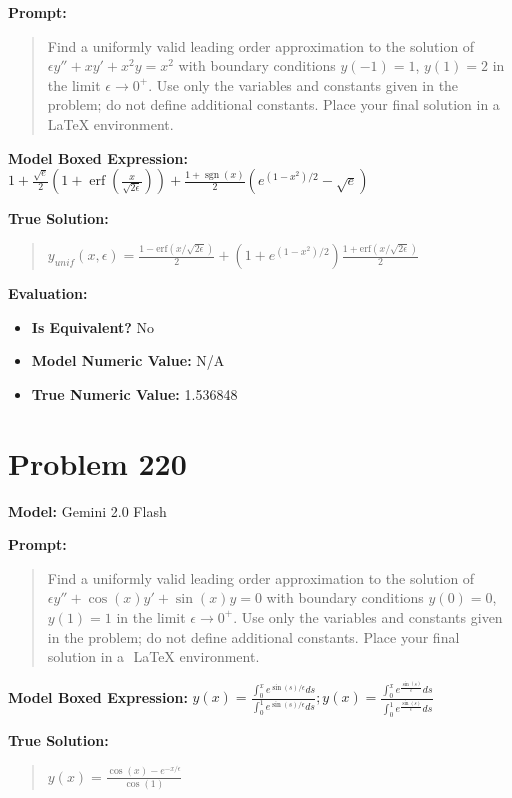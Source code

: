 \documentclass{article}
\begin{document}
{\textbf{Prompt:}
\begin{quote}
Find a uniformly valid leading order approximation to the solution of $\epsilon y'' + x y' + x^2 y = x^2$ with boundary conditions $y(-1) = 1$, $y(1) = 2$ in the limit $\epsilon \to 0^+$. Use only the variables and constants given in the problem; do not define additional constants. Place your final solution in a $\boxed{}$ LaTeX environment.
\end{quote}
\textbf{Model Boxed Expression:} $1 + \frac{\sqrt{e}}{2}\left(1 + \operatorname{erf}\left(\frac{x}{\sqrt{2\epsilon}}\right)\right) + \frac{1+\operatorname{sgn}(x)}{2}\left(e^{(1-x^2)/2} - \sqrt{e}\right)$

\textbf{True Solution:}
\begin{quote}
$y_{unif}(x, \epsilon) = \frac{1-\text{erf}(x/\sqrt{2\epsilon})}{2} + \left(1 + e^{(1-x^2)/2}\right) \frac{1+\text{erf}(x/\sqrt{2\epsilon})}{2}$
\end{quote}

\textbf{Evaluation:}
\begin{itemize}
\item \textbf{Is Equivalent?} No
\item \textbf{Model Numeric Value:} N/A
\item \textbf{True Numeric Value:} 1.536848
\end{itemize}
\vspace{1cm}
\section*{Problem 220}
\textbf{Model:} Gemini 2.0 Flash

\textbf{Prompt:}
\begin{quote}
Find a uniformly valid leading order approximation to the solution of $\epsilon y'' + \cos(x) y ' + \sin(x) y= 0$ with boundary conditions $y(0) = 0$, $y(1)= 1$ in the limit $\epsilon \to 0^+$. Use only the variables and constants given in the problem; do not define additional constants. Place your final solution in a $\boxed{}$ LaTeX environment.
\end{quote}
\textbf{Model Boxed Expression:} $y(x) = \frac{\int_0^x e^{\sin(s)/\epsilon} ds}{\int_0^1 e^{\sin(s)/\epsilon} ds}; y(x) = \frac{\int_0^x e^{\frac{\sin(s)}{\epsilon}} ds}{\int_0^1 e^{\frac{\sin(s)}{\epsilon}} ds}$

\textbf{True Solution:}
\begin{quote}
$y(x) = \frac{\cos(x)- e^{-x/\epsilon}}{\cos(1)}$
\end{quote}

}
\end{document}

